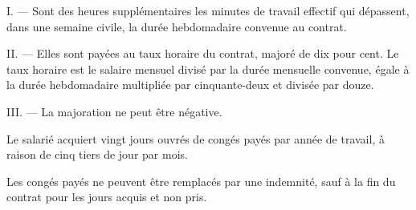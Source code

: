 I. --- Sont des heures supplémentaires les minutes de travail effectif qui
dépassent, dans une semaine civile, la durée hebdomadaire convenue au contrat.

II. --- Elles sont payées au taux horaire du contrat, majoré de dix pour cent.
Le taux horaire est le salaire mensuel divisé par la durée mensuelle convenue,
égale à la durée hebdomadaire multipliée par cinquante-deux et divisée par
douze.

III. --- La majoration ne peut être négative.

\label{art:conges}
Le salarié acquiert vingt jours ouvrés de congés payés par année de travail,
à raison de cinq tiers de jour par mois.

Les congés payés ne peuvent être remplacés par une indemnité, sauf à la fin du
contrat pour les jours acquis et non pris.
